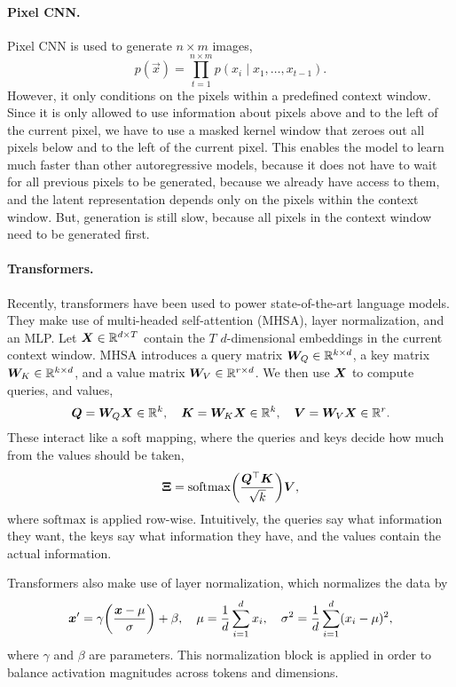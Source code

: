 \paragraph{Pixel CNN.}

Pixel CNN is used to generate $n \times m$ images, \[
    p(\vec{x}) = \prod_{t=1}^{n\times m} p(x_i \mid x_1, \ldots, x_{t-1}).
\]
However, it only conditions on the pixels within a predefined context window. Since it is only
allowed to use information about pixels above and to the left of the current pixel, we have to use
a masked kernel window that zeroes out all pixels below and to the left of the current pixel. This
enables the model to learn much faster than other autoregressive models, because it does not have
to wait for all previous pixels to be generated, because we already have access to them, and the
latent representation depends only on the pixels within the context window. But, generation is
still slow, because all pixels in the context window need to be generated first.

\paragraph{Transformers.}

Recently, transformers have been used to power state-of-the-art language models. They make use of
multi-headed self-attention (MHSA), layer normalization, and an MLP. Let $\bm{X} \in \mathbb{R}^{d \times
        T}$ contain the $T$ $d$-dimensional embeddings in the current context window. MHSA introduces a
query matrix $\bm{W}_Q \in \mathbb{R}^{k \times d}$, a key matrix $\bm{W}_K \in \mathbb{R}^{k \times d}$, and a
value matrix $\bm{W}_V \in \mathbb{R}^{r \times d}$. We then use $\bm{X}$ to compute queries, and values, \[
    \bm{Q} = \bm{W}_Q \bm{X} \in \mathbb{R}^k, \quad \bm{K} = \bm{W}_K \bm{X} \in \mathbb{R}^k, \quad \bm{V} = \bm{W}_V \bm{X} \in \mathbb{R}^r.
\]
These interact like a soft mapping, where the queries and keys decide how much from the values
should be taken, \[
    \mat{\Xi} = \mathrm{softmax}\lft( \frac{\transpose{\mat{Q}} \mat{K}}{\sqrt{k}} \rgt) \mat{V},
\]
where $\mathrm{softmax}$ is applied row-wise. Intuitively, the queries say what information they
want, the keys say what information they have, and the values contain the actual information.

Transformers also make use of layer normalization, which normalizes the data by \[
    \vec{x}' = \gamma \lft( \frac{\vec{x} - \mu}{\sigma} \rgt) + \beta, \quad \mu = \frac{1}{d} \sum_{i=1}^{d} x_i, \quad \sigma^2 = \frac{1}{d} \sum_{i=1}^{d} (x_i - \mu)^2,
\]
where $\gamma$ and $\beta$ are parameters. This normalization block is applied in order to balance
activation magnitudes across tokens and dimensions.

